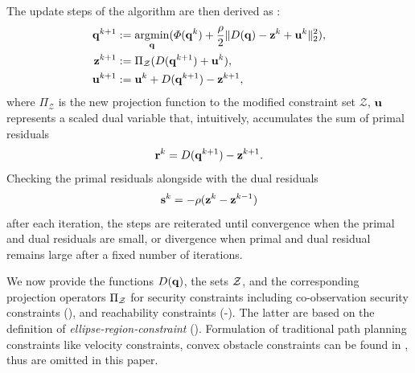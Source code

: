 \documentclass[10pt,twocolumn,twoside]{IEEEtran}
\begin{document}
The update steps of the algorithm are then derived as \cite{Boyd2011}:
\begin{subequations}\label{eq:ADMMupdate}
	\begin{align}
		\label{eq:admm-mod-update-q}\mathbf{q}^{k+1}&:=\operatorname*{\arg\!\min}_{\mathbf{q}}(\varPhi(\mathbf{q}^k) +\frac{\rho}{2}\lVert D(\mathbf{q})-\mathbf{z}^k+\mathbf{u}^k\rVert_2^2),\\
		\mathbf{z}^{k+1}&:=\Pi_\mathcal{Z}(D(\mathbf{q}^{k+1})+\mathbf{u}^k), \label{eq:z-update} \\
		\mathbf{u}^{k+1}&:=\mathbf{u}^k+D(\mathbf{q}^{k+1})-\mathbf{z}^{k+1},
	\end{align}
\end{subequations}
where $\Pi_\mathcal{Z}$ is the new projection function to the modified constraint set $\mathcal{Z}$, $\mathbf{u}$ represents a scaled dual variable that, intuitively, accumulates the sum of primal residuals
\begin{equation}\label{eq:primal-residual}
	\mathbf{r}^{k}=D(\mathbf{q}^{k+1})-\mathbf{z}^{k+1}.
\end{equation}
Checking the primal residuals alongside with the dual residuals 
\begin{equation}\label{eq:dual-residual}
	\mathbf{s}^{k}=-\rho(\mathbf{z}^{k}-\mathbf{z}^{k-1})
\end{equation}
after each iteration, the steps are reiterated until convergence when the primal and dual residuals are small, or divergence when primal and dual residual remains large after a fixed number of iterations.

We now provide the functions $D(\mathbf{q})$, the sets $\mathcal{Z}$, and the corresponding projection operators $\Pi_{\mathcal{Z}}$ for security constraints including co-observation security constraints (), and reachability constraints (-). The latter are based on the definition of \emph{ellipse-region-constraint} ().
Formulation of traditional path planning constraints like velocity constraints, convex obstacle constraints can be found in \cite{yang2020multi}, thus are omitted in this paper.
\end{document}
